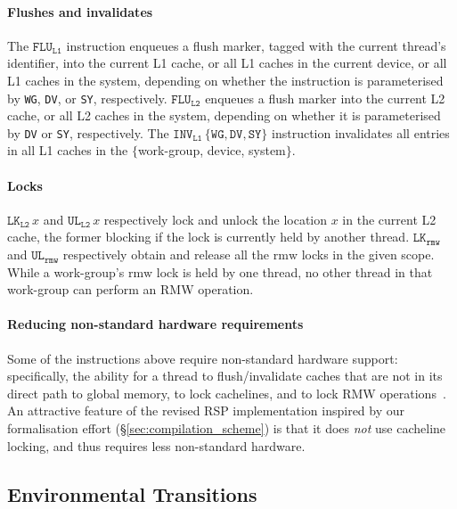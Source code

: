 \documentclass[svgnames,10pt]{sigplanconf}
\theoremstyle{definition}
\newcommand\INSflushl[1]{\texttt{FLU$_{\texttt{L#1}}$}}
\newcommand\INSinvall[1]{\texttt{INV$_{\texttt{L#1}}$}}
\newcommand\INSlk[1]{\texttt{LK$_{\texttt{#1}}$}}
\newcommand\INSul[1]{\texttt{UL$_{\texttt{#1}}$}}
\begin{document}
\paragraph{Flushes and invalidates}
The $\INSflushl1$ instruction enqueues a flush marker, tagged with the
current thread's identifier, into the current L1 cache, or all L1
caches in the current device, or all L1 caches in the system,
depending on whether the instruction is parameterised by \texttt{WG},
\texttt{DV}, or \texttt{SY}, respectively. $\INSflushl2$ enqueues a
flush marker into the current L2 cache, or all L2 caches in the
system, depending on whether it is parameterised by \texttt{DV} or
\texttt{SY}, respectively. The
$\INSinvall1\,\{\texttt{WG}, \texttt{DV}, \texttt{SY}\}$ instruction
invalidates all entries in all L1 caches in the $\{$work-group,
device, system$\}$.

\paragraph{Locks}
$\INSlk{L2}\,x$ and $\INSul{L2}\,x$ respectively lock and unlock the
location $x$ in the current L2 cache, the former blocking if the lock
is currently held by another thread. $\INSlk{rmw}$ and $\INSul{rmw}$
respectively obtain and release all the $\mathrm{rmw}$ locks in the
given scope. While a work-group's $\mathrm{rmw}$ lock is held by one
thread, no other thread in that work-group can perform an RMW
operation.

\paragraph{Reducing non-standard hardware requirements}
Some of the instructions above require non-standard hardware support:
specifically, the ability for a thread to flush/invalidate caches that
are not in its direct path to global memory, to lock cachelines, and
to lock RMW operations~\cite[\S4.4]{orr+15}. An attractive feature of
the revised RSP implementation inspired by our formalisation effort (\S\ref{sec:compilation_scheme}) is
that it does \emph{not} use cacheline locking, and thus requires less
non-standard hardware.


\subsection{Environmental Transitions}
\label{sec:environmental_transitions}
\end{document}
